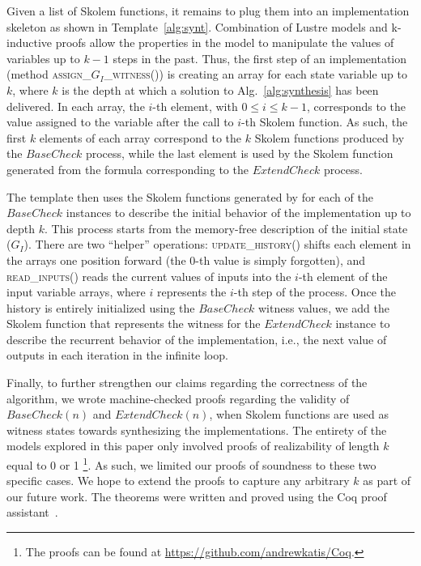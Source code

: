 Given a list of Skolem functions, it remains to plug them into
an implementation skeleton as shown in Template~\ref{alg:synt}. 
Combination of Lustre models and k-inductive proofs
allow the properties in the model to manipulate the
 values of variables up to $k-1$ steps in the past. Thus,
the first step of an implementation  (method \textsc{assign\_$G_{I}$\_witness()})
 is creating an array for each state variable up to $k$, where
$k$ is the depth at which a solution to Alg.~\ref{alg:synthesis} has been delivered.
In each array, the $i$-th element, with $0\leq i \leq k-1$,
corresponds to the value assigned to the variable after the call to
$i$-th Skolem function. As such, the first $k$ elements of each array
correspond to the $k$ Skolem functions produced by the
$\mathit{BaseCheck}$ process, while the last element is used by the
Skolem function generated from the formula corresponding to the
$\mathit{ExtendCheck}$ process.

The template then uses the Skolem functions generated by \aeval for each
of the $\mathit{BaseCheck}$ instances to describe the initial behavior of
the implementation up to depth $k$.  This process starts from the memory-free
description of the initial state ($G_I$).
There are two ``helper'' operations:
\textsc{update\_history()} shifts each element in the arrays one position
forward (the 0-th value is simply forgotten), and \textsc{read\_inputs()} reads the
current values of inputs into the $i$-th element of the input variable arrays,
where $i$ represents the $i$-th step of the process.
Once the history is entirely initialized using the $\mathit{BaseCheck}$ witness values,
we add the Skolem function that represents the witness for the
$\mathit{ExtendCheck}$ instance to describe the recurrent behavior of the implementation, i.e.,
the next value of outputs in each iteration in the infinite loop.

Finally, to further strengthen our claims regarding the correctness of the algorithm,
we wrote machine-checked proofs regarding the validity of $\mathit{BaseCheck(n)}$ and
$\mathit{ExtendCheck(n)}$, when Skolem functions are used as witness states
towards synthesizing the implementations. The entirety of the models explored in
this paper only involved proofs of realizability of length $k$ equal to 0 or
1%
\footnote{The proofs can be found at \url{https://github.com/andrewkatis/Coq}.}.
As such, we limited our proofs of soundness to these two specific cases. We hope
to extend the proofs to capture any arbitrary $k$ as part of our future work.
The theorems were written and proved using the Coq proof
assistant~\cite{Coqmanual}.

